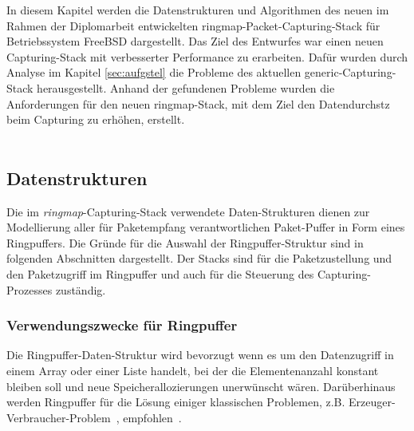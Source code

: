 In diesem Kapitel werden die Datenstrukturen und Algorithmen des neuen im
Rahmen der Diplomarbeit entwickelten ringmap-Packet-Capturing-Stack für
Betriebssystem FreeBSD dargestellt. Das Ziel des Entwurfes war einen neuen
Capturing-Stack mit verbesserter Performance zu erarbeiten. Dafür wurden
durch Analyse im Kapitel \ref{sec:aufgstel} die Probleme des aktuellen
generic-Capturing-Stack herausgestellt. Anhand der gefundenen Probleme
wurden die Anforderungen für den neuen ringmap-Stack, mit dem Ziel den
Datendurchstz beim Capturing zu erhöhen, erstellt.\\\\
%
\subsection{Datenstrukturen}
Die im \emph{ringmap}-Capturing-Stack verwendete Daten-Strukturen dienen zur Modellierung
aller für Paketempfang verantwortlichen Paket-Puffer in Form  eines
Ringpuffers. Die Gründe für die Auswahl der Ringpuffer-Struktur sind in
folgenden Abschnitten dargestellt. Der Stacks sind für die
Paketzustellung und den Paketzugriff im Ringpuffer und auch für die Steuerung
des Capturing-Prozesses zuständig.

\subsubsection{Verwendungszwecke für Ringpuffer}
Die Ringpuffer-Daten-Struktur wird bevorzugt wenn es um den Datenzugriff in
einem Array oder einer Liste handelt, bei der die Elementenanzahl konstant bleiben
soll und neue Speicherallozierungen unerwünscht wären. Darüberhinaus werden
Ringpuffer für die Lösung einiger klassischen Problemen, z.B.
Erzeuger-Verbraucher-Problem~\cite{erz_verbr_wiki},
empfohlen~\cite{ldd_book_circle_buffer}.

